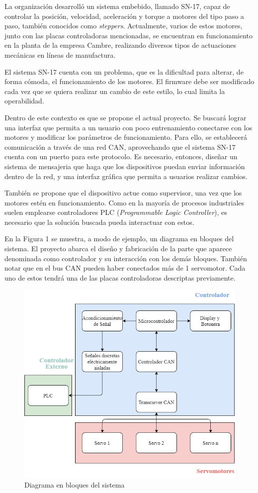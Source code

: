 \documentclass[
11pt, %
]{charter}
\begin{document}
La organización \empclientename{} desarrolló un sistema embebido, llamado SN-17, capaz de controlar la posición, velocidad, aceleración y torque a motores del tipo paso a paso, también conocidos como \textit{steppers}. Actualmente, varios de estos motores, junto con las placas controladoras mencionadas, se encuentran en funcionamiento en la planta de la empresa Cambre, realizando diversos tipos de actuaciones mecánicas en líneas de manufactura.

El sistema SN-17 cuenta con un problema, que es la dificultad para alterar, de forma cómoda, el funcionamiento de los motores. El firmware debe ser modificado cada vez que se quiera realizar un cambio de este estilo, lo cual limita la operabilidad. 

Dentro de este contexto es que se propone el actual proyecto. Se buscará lograr una interfaz que permita a un usuario con poco entrenamiento conectarse con los motores y modificar los parámetros de funcionamiento. Para ello, se establecerá comunicación a través de una red CAN, aprovechando que el sistema SN-17 cuenta con un puerto para este protocolo. Es necesario, entonces, diseñar un sistema de mensajeria que haga que los dispositivos puedan enviar información dentro de la red, y una interfaz gráfica que permita a usuarios realizar cambios.

También se propone que el dispositivo actue como supervisor, una vez que los motores estén en funcionamiento. Como en la mayoría de procesos industriales suelen emplearse controladores PLC (\textit{Programmable Logic Controller}), es necesario que la solución buscada pueda interactuar con estos.

En la Figura 1 se muestra, a modo de ejemplo, un diagrama en bloques del sistema. El proyecto abarca el diseño y fabricación de la parte que aparece denominada como controlador y su interacción con los demás bloques. También notar que en el bus CAN pueden haber conectados más de 1 servomotor. Cada uno de estos tendrá una de las placas controladoras descriptas previamente.

\begin{figure}[htpb]
\centering 
\includegraphics[width=.8\textwidth]{./Figuras/CAN_Servo_controller.png}
\caption{Diagrama en bloques del sistema}
\label{fig:diagBloques}
\end{figure}
\end{document}

